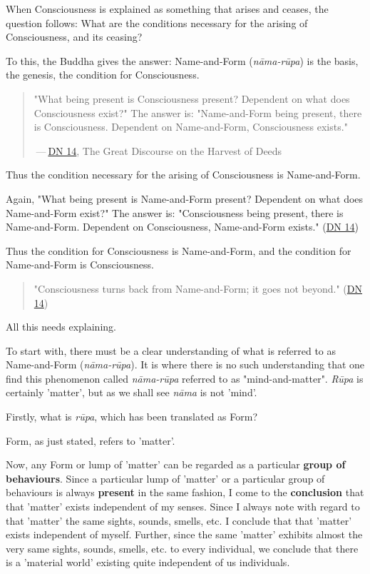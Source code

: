 When Consciousness is explained as something that arises and ceases, the
question follows: What are the conditions necessary for the arising of
Consciousness, and its ceasing?


To this, the Buddha gives the answer: Name-and-Form (\emph{nāma-rūpa}) is
the basis, the genesis, the condition for Consciousness.


\begin{quotation}
"What being present is Consciousness present? Dependent on what does
Consciousness exist?" The answer is: "Name-and-Form being present, there
is Consciousness. Dependent on Name-and-Form, Consciousness
exists."


 — \href{https://suttacentral.net/dn14/en/sujato}{DN 14}, The Great Discourse on the Harvest of Deeds


\end{quotation}

Thus the condition necessary for the arising of Consciousness is
Name-and-Form.


Again, "What being present is Name-and-Form present? Dependent on what
does Name-and-Form exist?" The answer is: "Consciousness being present,
there is Name-and-Form. Dependent on Consciousness, Name-and-Form
exists." (\href{https://suttacentral.net/dn14/en/sujato}{DN 14})


Thus the condition for Consciousness is Name-and-Form, and the condition
for Name-and-Form is Consciousness.


\begin{quotation}
"Consciousness turns back from Name-and-Form; it goes not beyond." (\href{https://suttacentral.net/dn14/en/sujato}{DN 14})


\end{quotation}

All this needs explaining.


To start with, there must be a clear understanding of what is referred
to as Name-and-Form (\emph{nāma-rūpa}). It is where there is no such
understanding that one find this phenomenon called \emph{nāma-rūpa} referred
to as "mind-and-matter". \emph{Rūpa} is certainly 'matter', but as we shall
see \emph{nāma} is not 'mind'.


Firstly, what is \emph{rūpa}, which has been translated as Form?


Form, as just stated, refers to 'matter'.


Now, any Form or lump of 'matter' can be regarded as a particular
\textbf{group of behaviours}. Since a particular lump of 'matter' or a
particular group of behaviours is always \textbf{present} in the same fashion,
I come to the \textbf{conclusion} that that 'matter' exists independent of my
senses. Since I always note with regard to that 'matter' the same
sights, sounds, smells, etc. I conclude that that 'matter' exists
independent of myself. Further, since the same 'matter' exhibits almost
the very same sights, sounds, smells, etc. to every individual, we
conclude that there is a 'material world' existing quite independent of
us individuals.


